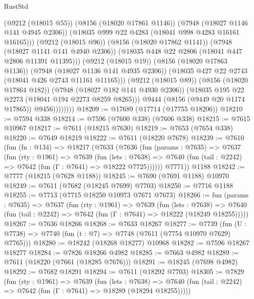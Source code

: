 \begin{lexlean}{RustStd}
\begin{coremodule}
{\begin{coremodule}
{{{{{{{{{{{{{{{{{{{{{{{{{{{{{{{{{{                            (@9212 (@18015 @55))
                            (@8156 (@18020 @17861 @1146))
                            (@7948 (@18027 @1146 @141 @4945 @2306))
                            (@18035 @999 @22 @4283 (@18041 @998 @4283 @16161 @16165)))
                          (@9212 (@18015 @96))
                          (@8156 (@18020 @17862 @1141))
                          (@7948 (@18027 @1141 @141 @4940 @2306))
                          (@18035 @448 @22 @2806 (@18041 @447 @2806 @11391 @11395)))
                        (@9212 (@18015 @19))
                        (@8156 (@18020 @17863 @1136))
                        (@7948 (@18027 @1136 @141 @4935 @2306))
                        (@18035 @427 @22 @2743 (@18041 @426 @2743 @11161 @11165)))
                      (@9212 (@18015 @89))
                      (@8156 (@18020 @17864 @182))
                      (@7948 (@18027 @182 @141 @4930 @2306))
                      (@18035 @195 @22 @2273 (@18041 @194 @2273 @8259 @8265)))
                    @9444
                    (@8156 (@9449 @20 @1174 @17865))
                    @9456))))))))
@18209 := @17689 (@17714 (@17755 @18206))
@18210 := @7594 @338
@18214 := @7596 (@7600 @338) (@7606 @338)
@18215 := @7615 @10967
@18217 := @7611 (@18215 @7630)
@18219 := @7653 (@7654 @338)
@18220 := @7649 @18219
@18222 := @7611 (@18220 @7678)
@18239 := @7610
    (fun (fn : @134) =>
    @18217
      (@7633
        (@7636
          (fun (params : @7635) =>
          @7637
            (fun (rty : @1961) =>
            @7639
              (fun (lets : @7638) =>
              @7640 (fun (tail : @2242) => @7642 (fun (Γ : @7641) => @18222 @7725))))))
        @7771))
    @1188
@18242 := @7777 (@18215 (@7628 @1188))
@18245 := @7690 (@7691 @1188) @10970
@18249 := @7611 (@7682 (@18245 @7699) @7703)
@18250 := @7716 @1188
@18255 := @7713 (@7715 @18250 @10973 @7671 @7673)
@18266 := fun (params : @7635) =>
  @7637
    (fun (rty : @1961) =>
    @7639
      (fun (lets : @7638) =>
      @7640 (fun (tail : @2242) => @7642 (fun (Γ : @7641) => @18222 (@18249 @18255)))))
@18267 := @7636 @18266
@18268 := @7633 @18267
@18277 := @7739
    (fun (U : @7738) => @7740 (fun (t : @7) => @7748 (@7611 (@7754 @10970 @7629) @7765)))
@18280 := @18242 (@18268 @18277) @10968
@18282 := @7596 @18267 @18277
@18284 := @7826 @18266 @4982
@18285 := @7663 @4982
@18289 := @7611 (@18220 (@7661 (@18285 @7676)))
@18291 := @18245 (@7698 @4982)
@18292 := @7682 @18291
@18294 := @7611 (@18292 @7703)
@18305 := @7829
    (fun (rty : @1961) =>
    @7639
      (fun (lets : @7638) =>
      @7640 (fun (tail : @2242) => @7642 (fun (Γ : @7641) => @18289 (@18294 @18255)))))
}}}}}}}}}}}}}}}}}}}}}}}}}}}}}}}}}}
\end{coremodule}}
\end{coremodule}
\end{lexlean}

